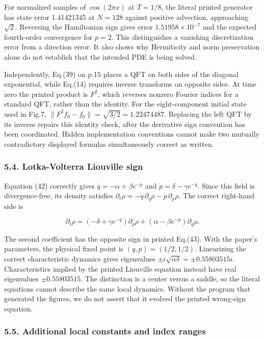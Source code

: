 For normalized samples of \(\cos(2\pi x)\) at \(T=1/8\), the literal
printed generator has state error 1.41421345 at \(N=128\) against
positive advection, approaching \(\sqrt2\). Reversing the Hamiltonian
sign gives error \(1.51958\times10^{-7}\) and the expected fourth-order
convergence for \(p=2\). This distinguishes a vanishing discretization
error from a direction error. It also shows why Hermiticity and norm
preservation alone do not establish that the intended PDE is being
solved.

Independently, Eq.(39) on p.15 places a QFT on both sides of the
diagonal exponential, while Eq.(14) requires inverse transforms on
opposite sides. At time zero the printed product is \(F^2\), which
reverses nonzero Fourier indices for a standard QFT, rather than the
identity. For the eight-component initial state used in Fig.7,
\(\|F^2f_0-f_0\|=\sqrt{3/2}=1.22474487\). Replacing the left QFT by its
inverse repairs this identity check, after the derivative sign
convention has been coordinated. Hidden implementation conventions
cannot make two mutually contradictory displayed formulas simultaneously
correct as written.

\subsubsection{5.4. Lotka-Volterra Liouville
sign}\label{lotka-volterra-liouville-sign}

Equation (42) correctly gives \(\dot q=-\alpha+\beta e^{-p}\) and
\(\dot p=\delta-\gamma e^{-q}\). Since this field is divergence-free,
its density satisfies
\(\partial_t\rho=-\dot q\,\partial_q\rho-\dot p\,\partial_p\rho\). The
correct right-hand side is

\[
\partial_t\rho=(-\delta+\gamma e^{-q})\partial_p\rho
+(\alpha-\beta e^{-p})\partial_q\rho. \tag{16}
\]

The second coefficient has the opposite sign in printed Eq.(43). With
the paper's parameters, the physical fixed point is \((q,p)=(1/2,1/2)\).
Linearizing the correct characteristic dynamics gives eigenvalues
\(\pm i\sqrt{\alpha\delta}=\pm0.55803515i\). Characteristics implied by
the printed Liouville equation instead have real eigenvalues
\(\pm0.55803515\). The distinction is a center versus a saddle, so the
literal equations cannot describe the same local dynamics. Without the
program that generated the figures, we do not assert that it evolved the
printed wrong-sign equation.

\subsubsection{5.5. Additional local constants and index
ranges}\label{additional-local-constants-and-index-ranges}

